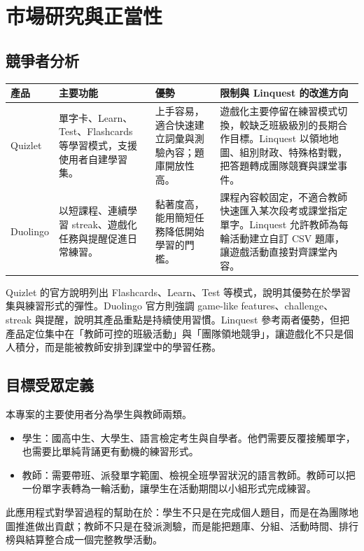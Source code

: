 \documentclass[12pt,a4paper]{article}
\begin{document}
\section{市場研究與正當性}

\subsection{競爭者分析}

\begin{longtable}{P{2.5cm}P{4.0cm}P{3.7cm}P{4.4cm}}
\toprule
產品 & 主要功能 & 優勢 & 限制與 Linquest 的改進方向 \\
\midrule
Quizlet & 單字卡、Learn、Test、Flashcards 等學習模式，支援使用者自建學習集。 & 上手容易，適合快速建立詞彙與測驗內容；題庫開放性高。 & 遊戲化主要停留在練習模式切換，較缺乏班級級別的長期合作目標。Linquest 以領地地圖、組別財政、特殊格對戰，把答題轉成團隊競賽與課堂事件。 \\
\midrule
Duolingo & 以短課程、連續學習 streak、遊戲化任務與提醒促進日常練習。 & 黏著度高，能用簡短任務降低開始學習的門檻。 & 課程內容較固定，不適合教師快速匯入某次段考或課堂指定單字。Linquest 允許教師為每輪活動建立自訂 CSV 題庫，讓遊戲活動直接對齊課堂內容。 \\
\bottomrule
\end{longtable}

Quizlet 的官方說明列出 Flashcards、Learn、Test 等模式，說明其優勢在於學習集與練習形式的彈性。Duolingo 官方則強調 game-like features、challenge、streak 與提醒，說明其產品重點是持續使用習慣。Linquest 參考兩者優勢，但把產品定位集中在「教師可控的班級活動」與「團隊領地競爭」，讓遊戲化不只是個人積分，而是能被教師安排到課堂中的學習任務。

\subsection{目標受眾定義}

本專案的主要使用者分為學生與教師兩類。

\begin{itemize}
  \item 學生：國高中生、大學生、語言檢定考生與自學者。他們需要反覆接觸單字，也需要比單純背誦更有動機的練習形式。
  \item 教師：需要帶班、派發單字範圍、檢視全班學習狀況的語言教師。教師可以把一份單字表轉為一輪活動，讓學生在活動期間以小組形式完成練習。
\end{itemize}

此應用程式對學習過程的幫助在於：學生不只是在完成個人題目，而是在為團隊地圖推進做出貢獻；教師不只是在發派測驗，而是能把題庫、分組、活動時間、排行榜與結算整合成一個完整教學活動。
\end{document}
